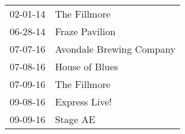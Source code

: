\begin{supertabular}{p{0.07\textwidth}p{0.23\textwidth}}
 02-01-14 &              The Fillmore \\
 06-28-14 &            Fraze Pavilion \\
 07-07-16 &  Avondale Brewing Company \\
 07-08-16 &            House of Blues \\
 07-09-16 &              The Fillmore \\
 09-08-16 &             Express Live! \\
 09-09-16 &                  Stage AE \\
\end{supertabular}
